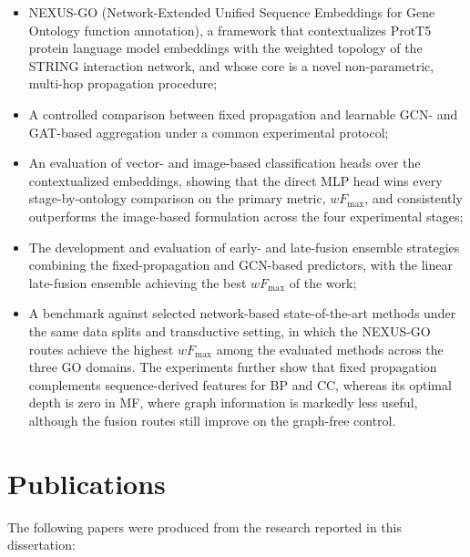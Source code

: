\documentclass[Ingles]{ic-tese-v3}
\begin{document}
\begin{itemize}

\item NEXUS-GO (Network-Extended Unified Sequence Embeddings for Gene Ontology function annotation), a framework that contextualizes ProtT5 protein language model embeddings with the weighted topology of the STRING interaction network, and whose core is a novel non-parametric, multi-hop propagation procedure;

\item A controlled comparison between fixed propagation and learnable GCN- and GAT-based aggregation under a common experimental protocol;

\item An evaluation of vector- and image-based classification heads over the contextualized embeddings, showing that the direct MLP head wins every stage-by-ontology comparison on the primary metric, $wF_{\max}$, and consistently outperforms the image-based formulation across the four experimental stages;

\item The development and evaluation of early- and late-fusion ensemble strategies combining the fixed-propagation and GCN-based predictors, with the linear late-fusion ensemble achieving the best $wF_{\max}$ of the work;

\item A benchmark against selected network-based state-of-the-art methods under the same data splits and transductive setting, in which the NEXUS-GO routes achieve the highest $wF_{\max}$ among the evaluated methods across the three GO domains. The experiments further show that fixed propagation complements sequence-derived features for BP and CC, whereas its optimal depth is zero in MF, where graph information is markedly less useful, although the fusion routes still improve on the graph-free control.

\end{itemize}

\section{Publications}

The following papers were produced from the research reported in this dissertation:
\end{document}
